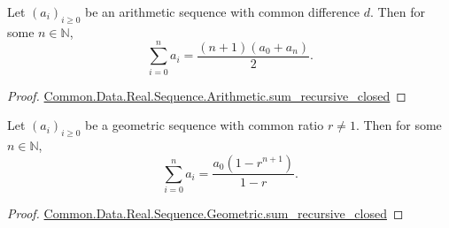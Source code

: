 \documentclass{article}
\begin{document}
\begin{theorem}

  Let $(a_i)_{i \geq 0}$ be an arithmetic sequence with common difference $d$.
  Then for some $n \in \mathbb{N}$,
  $$\sum_{i=0}^n a_i = \frac{(n + 1)(a_0 + a_n)}{2}.$$

\end{theorem}

\begin{proof}

  \href{Sequence.lean}{Common.Data.Real.Sequence.Arithmetic.sum_recursive_closed}

\end{proof}

\begin{theorem}

  Let $(a_i)_{i \geq 0}$ be a geometric sequence with common ratio $r \neq 1$.
  Then for some $n \in \mathbb{N}$,
  $$\sum_{i=0}^n a_i = \frac{a_0(1 - r^{n+1})}{1 - r}.$$

\end{theorem}

\begin{proof}

  \href{Sequence.lean}{Common.Data.Real.Sequence.Geometric.sum_recursive_closed}

\end{proof}
\end{document}
